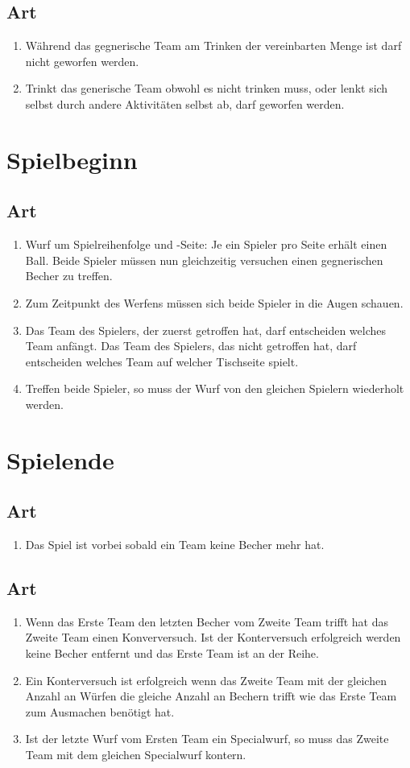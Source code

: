 \documentclass[a4paper,11pt]{scrartcl}
\newcommand{\enum}[1]{\begin{enumerate}[label=(\arabic*)]#1\end{enumerate}}
\newcommand{\art}[2]{\subsection*{#1} \enum{#2}}
\newcounter{art}
\begin{document}
\art{Art \theart}{
    \item
        Während das gegnerische Team am Trinken der vereinbarten Menge ist darf nicht geworfen werden.
    \item
        Trinkt das generische Team obwohl es nicht trinken muss, oder lenkt sich selbst durch andere Aktivitäten selbst ab, darf geworfen werden.
}

\section{Spielbeginn}

\art{Art \theart}{
    \item
        Wurf um Spielreihenfolge und -Seite: Je ein Spieler pro Seite erhält einen Ball. Beide Spieler müssen nun gleichzeitig versuchen einen gegnerischen Becher zu treffen.
    \item
        Zum Zeitpunkt des Werfens müssen sich beide Spieler in die Augen schauen.
    \item
        Das Team des Spielers, der zuerst getroffen hat, darf entscheiden welches Team anfängt. Das Team des Spielers, das nicht getroffen hat, darf entscheiden welches Team auf welcher Tischseite spielt.
    \item
        Treffen beide Spieler, so muss der Wurf von den gleichen Spielern wiederholt werden.
}

\section{Spielende}

\art{Art \theart}{
    \item
        Das Spiel ist vorbei sobald ein Team keine Becher mehr hat.
}

\art{Art \theart}{
    \item
        Wenn das Erste Team den letzten Becher vom Zweite Team trifft hat das Zweite Team einen Konverversuch. Ist der Konterversuch erfolgreich werden keine Becher entfernt und das Erste Team ist an der Reihe.
    \item
        Ein Konterversuch ist erfolgreich wenn das Zweite Team mit der gleichen Anzahl an Würfen die gleiche Anzahl an Bechern trifft wie das Erste Team zum Ausmachen benötigt hat.
    \item
        Ist der letzte Wurf vom Ersten Team ein Specialwurf, so muss das Zweite Team mit dem gleichen Specialwurf kontern.
}
\end{document}
